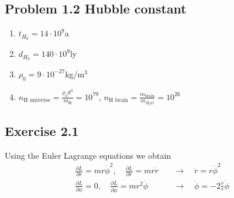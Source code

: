 \documentclass[10pt,a4paper]{book}
\theoremstyle{definition}
\begin{document}
\subsection{Problem 1.2 Hubble constant}
\begin{enumerate}
\item $t_{H_0}=14\cdot10^{9}$a
\item $d_{H_0}=140\cdot10^{9}$ly
\item $\rho_0=9\cdot10^{-27}$kg/m$^3$
\item $n_\text{H universe}=\frac{\rho_0 d^3}{m_\text{H}}=10^{79}$, $n_\text{H brain}=\frac{m_\text{brain}}{m_{H_2O}}=10^{26}$
\end{enumerate}

\subsection{Exercise 2.1}
Using the Euler Lagrange equations we obtain
\begin{align}
\frac{\partial L}{\partial r}=mr\dot\phi^2,\quad\frac{\partial L}{\partial\dot r}=mr\dot r\quad&\rightarrow\quad\ddot r=r\dot\phi^2\\
\frac{\partial L}{\partial \phi}=0,\quad\frac{\partial L}{\partial\dot\phi}=mr^2\dot \phi\quad&\rightarrow\quad\ddot\phi=-2\frac{\dot r}{r}\dot\phi
\end{align}
\end{document}
